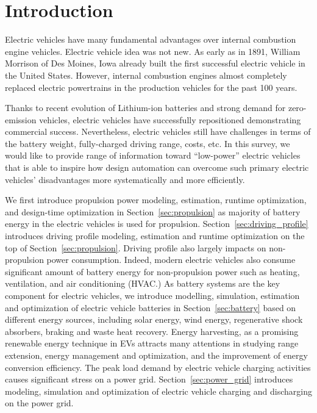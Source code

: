 
\section{Introduction}

Electric vehicles have many fundamental advantages over internal combustion engine vehicles. Electric vehicle idea was not new. As early as in 1891, William Morrison of Des Moines, Iowa already built the first successful electric vehicle in the United States. However, internal combustion engines almost completely replaced electric powertrains in the production vehicles for the past 100 years. 

Thanks to recent evolution of Lithium-ion batteries and strong demand for zero-emission vehicles, electric vehicles have successfully repositioned demonstrating commercial success. Nevertheless, electric vehicles still have challenges in terms of the battery weight, fully-charged driving range, costs, etc. In this survey, we would like to provide range of information toward “low-power” electric vehicles that is able to inspire how design automation can overcome such primary electric vehicles’ disadvantages more systematically and more efficiently. 

We first introduce propulsion power modeling, estimation, runtime optimization, and design-time optimization in Section~\ref{sec:propulsion} as majority of battery energy in the electric vehicles is used for propulsion. Section~\ref{sec:driving_profile} introduces driving profile modeling, estimation and runtime optimization on the top of Section~\ref{sec:propulsion}. Driving profile also largely impacts on non-propulsion power consumption. Indeed, modern electric vehicles also consume significant amount of battery energy for non-propulsion power such as heating, ventilation, and air conditioning (HVAC.) As battery systems are the key component for electric vehicles, we introduce modelling, simulation, estimation and optimization of electric vehicle batteries in Section~\ref{sec:battery} based on different energy sources, including solar energy, wind energy, regenerative shock absorbers, braking and waste heat recovery. Energy harvesting, as a promising renewable energy technique in EVs attracts many attentions in studying range extension, energy management and optimization, and the improvement of energy conversion efficiency. The peak load demand by electric vehicle charging activities causes significant stress on a power grid. Section~\ref{sec:power_grid} introduces modeling, simulation and optimization of electric vehicle charging and discharging on the power grid.


